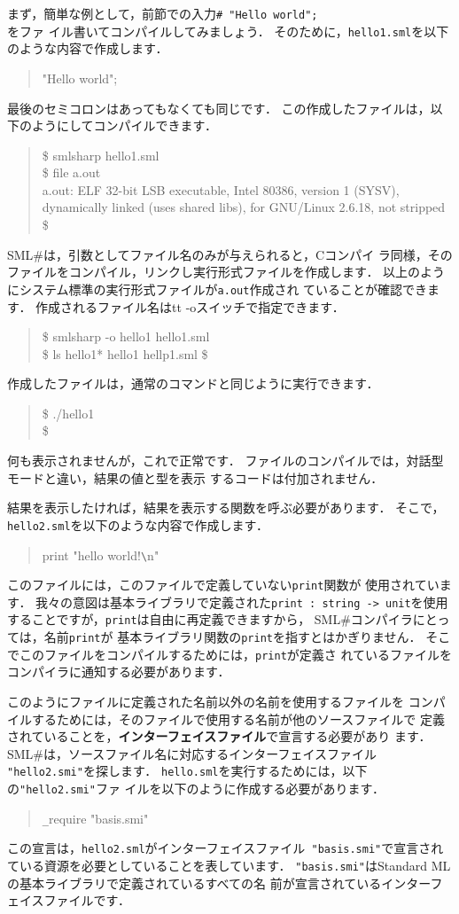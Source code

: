\documentclass{jbook}
\newcommand{\smlsharp}{SML\#}
\newenvironment{program}{\begin{tt}\begin{quote}}{\end{quote}\end{tt}}
\begin{document}
	まず，簡単な例として，前節での入力{\tt \# "Hello world";\\}をファ
イル書いてコンパイルしてみましょう．
	そのために，{\tt hello1.sml}を以下のような内容で作成します．
\begin{program}
"Hello world";
\end{program}
	最後のセミコロンはあってもなくても同じです．
	この作成したファイルは，以下のようにしてコンパイルできます．
\begin{program}
\$ smlsharp hello1.sml\\
\$ file a.out\\
a.out: ELF 32-bit LSB executable, Intel 80386, version 1 (SYSV), dynamically linked (uses shared libs), for GNU/Linux 2.6.18, not stripped\\
\$
\end{program}
	\smlsharp{}は，引数としてファイル名のみが与えられると，Cコンパイ
ラ同様，そのファイルをコンパイル，リンクし実行形式ファイルを作成します．
	以上のようにシステム標準の実行形式ファイルが{\tt a.out}作成され
ていることが確認できます．
	作成されるファイル名は{tt -o}スイッチで指定できます．
\begin{program}
\$ smlsharp -o hello1 hello1.sml\\
\$ ls hello1*
hello1 hellp1.sml
\$ 
\end{program}
	作成したファイルは，通常のコマンドと同じように実行できます．
\begin{program}
\$ ./hello1\\
\$ 
\end{program}
	何も表示されませんが，これで正常です．
	ファイルのコンパイルでは，対話型モードと違い，結果の値と型を表示
するコードは付加されません．

	結果を表示したければ，結果を表示する関数を呼ぶ必要があります．
	そこで，{\tt hello2.sml}を以下のような内容で作成します．
\begin{program}
print "hello world!\verb|\|n"
\end{program}
	このファイルには，このファイルで定義していない{\tt print}関数が
使用されています．
	我々の意図は基本ライブラリで定義された{\tt print : string ->
unit}を使用することですが，{\tt print}は自由に再定義できますから，
\smlsharp{}コンパイラにとっては，名前{\tt print}が
基本ライブラリ関数の{\tt print}を指すとはかぎりません．
	そこでこのファイルをコンパイルするためには，{\tt print}が定義さ
れているファイルをコンパイラに通知する必要があります．

	このようにファイルに定義された名前以外の名前を使用するファイルを
コンパイルするためには，そのファイルで使用する名前が他のソースファイルで
定義されていることを，{\bf インターフェイスファイル}で宣言する必要があり
ます． 
	\smlsharp{}は，ソースファイル名に対応するインターフェイスファイル
{\tt "hello2.smi"}を探します．
	{\tt hello.sml}を実行するためには，以下の{\tt "hello2.smi"}ファ
イルを以下のように作成する必要があります．
\begin{program}
\verb|_|require "basis.smi"
\end{program}
	この宣言は，{\tt hello2.sml}がインターフェイスファイル{\tt
"basis.smi"}で宣言されている資源を必要としていることを表しています．
{\tt "basis.smi"}はStandard MLの基本ライブラリで定義されているすべての名
前が宣言されているインターフェイスファイルです．
\end{document}
